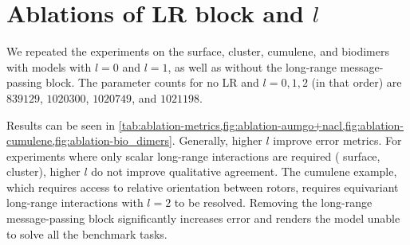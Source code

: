 \documentclass[10pt]{article}
\begin{document}
\clearpage
\section{Ablations of LR block and $l$}
\label{sec:apx-ablations}

We repeated the experiments on the  surface,  cluster, cumulene, and biodimers with \lorem models with $l=0$ and $l=1$, as well as without the long-range message-passing block. The parameter counts for no LR and $l=0,1,2$ (in that order) are  $839129$, $1020300$, $1020749$, and $1021198$.

Results can be seen in \cref{tab:ablation-metrics,fig:ablation-aumgo+nacl,fig:ablation-cumulene,fig:ablation-bio_dimers}.
Generally, higher $l$ improve error metrics.
For experiments where only scalar long-range interactions are required ( surface,  cluster), higher $l$ do not improve qualitative agreement.
The cumulene example, which requires access to relative orientation between rotors, requires equivariant long-range interactions with $l=2$ to be resolved.
Removing the long-range message-passing block significantly increases error and renders the model unable to solve all the benchmark tasks.


\begin{table}
    \caption{Root mean squared errors for energy $E$ and forces $\F$ for datasets used in Sec. 6.1 of the main text, for different \lorem variants. See Tab. 1 of the main text for details.}
    \centering
    
    \label{tab:ablation-metrics}
\end{table}
\end{document}
